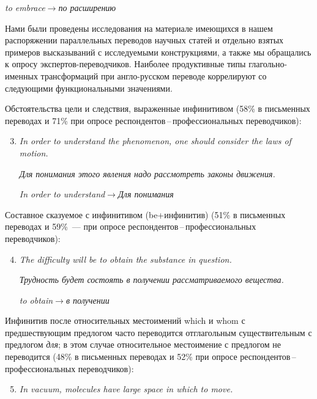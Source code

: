 \begin{multicols}{2}
\begin{enumerate}[(1)]
\textit{to embrace}\;$\rightarrow$\;\textit{по расширению}
\end{enumerate}

Нами были проведены исследования на материале имеющихся в нашем распоряжении 
параллельных переводов научных статей и отдельно взятых примеров высказываний с 
исследуемыми конструкциями, а также мы обращались к опросу 
экспертов-переводчиков. Наиболее продуктивные типы глагольно-именных 
трансформаций при англо-русском переводе коррелируют со сле\-ду\-ющи\-ми 
функциональными значениями.

{\sf Обстоятельства цели и следствия, выраженные инфинитивом (58\% в
письменных переводах и 71\% при опросе
респондентов\,--\,профессиональных переводчиков):}


\begin{enumerate}[(1)]
\setcounter{enumi}{2}
\item  \textit{In order to understand the phenomenon, one should consider
the laws of motion.}

\textit{Для понимания этого явления надо рас\-смот\-реть законы
движения.}

\textit{In order to understand}\;$\rightarrow$\;\textit{Для понимания }
\end{enumerate}

{\sf Составное сказуемое с инфинитивом (be\;+\;ин\-фи\-ни\-тив) (51\% в
письменных переводах и 59\%~--- при опросе
респондентов\,--\,профессиональных переводчиков):}

\begin{enumerate}[(1)]
\setcounter{enumi}{3}
\item \textit{The difficulty will be to obtain the substance in question.}

\textit{Трудность будет состоять в получении рас\-смат\-ри\-ва\-е\-мо\-го 
вещества.}

\textit{to obtain}\;$\rightarrow$\;\textit{в получении}
\end{enumerate}

{\sf Инфинитив после относительных местоимений which и whom с предшествующим 
предлогом час\-то пе\-ре\-во\-дит\-ся отглагольным существительным с предлогом 
\textsl{для}; в этом случае относительное местоимение с предлогом не 
переводится (48\% в письменных переводах и 52\% при опросе 
рес\-пон\-ден\-тов\,--\,про\-фес\-сио\-наль\-ных переводчиков):}
\begin{enumerate}[(1)]
\setcounter{enumi}{4}
\item \textit{In vacuum, molecules have large space in which to move.}


\end{enumerate}
\end{multicols}
